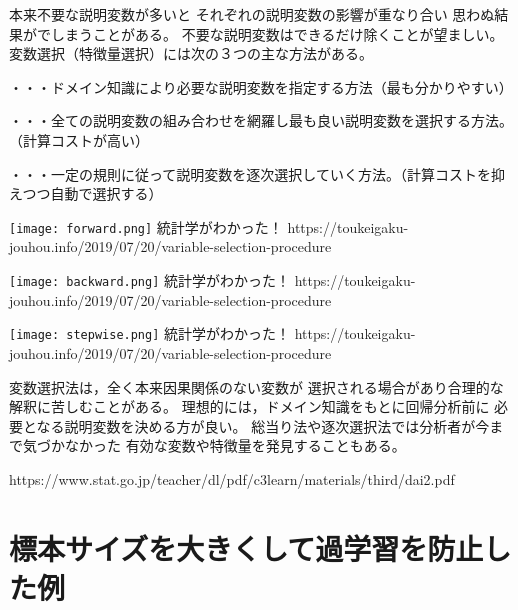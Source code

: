 \MyFrame{\insertsection}
{
  本来不要な説明変数が多いと
  それぞれの説明変数の影響が重なり合い
  思わぬ結果がでしまうことがある。
  不要な説明変数はできるだけ除くことが望ましい。
  変数選択（特徴量選択）には次の３つの主な方法がある。
  \MyEnums
  {
    \item {}・・・ドメイン知識により必要な説明変数を指定する方法（最も分かりやすい）
    \item {}・・・全ての説明変数の組み合わせを網羅し最も良い説明変数を選択する方法。（計算コストが高い）
    \item {}・・・一定の規則に従って説明変数を逐次選択していく方法。（計算コストを抑えつつ自動で選択する）
  }
}

{
  \texttt{[image: forward.png]}
  \MyRef
  {統計学がわかった！}
  {https://toukeigaku-jouhou.info/2019/07/20/variable-selection-procedure}
}

{
  \texttt{[image: backward.png]}
  \MyRef
  {統計学がわかった！}
  {https://toukeigaku-jouhou.info/2019/07/20/variable-selection-procedure}
}

{
  \texttt{[image: stepwise.png]}
  \MyRef
  {統計学がわかった！}
  {https://toukeigaku-jouhou.info/2019/07/20/variable-selection-procedure}
}

{
  変数選択法は，全く本来因果関係のない変数が
  選択される場合があり合理的な解釈に苦しむことがある。
  理想的には，ドメイン知識をもとに回帰分析前に
  必要となる説明変数を決める方が良い。
  総当り法や逐次選択法では分析者が今まで気づかなかった
  有効な変数や特徴量を発見することもある。
}

{
  {https://www.stat.go.jp/teacher/dl/pdf/c3learn/materials/third/dai2.pdf}
}

\appendix

\section{標本サイズを大きくして過学習を防止した例}

{
  {
  }
}

